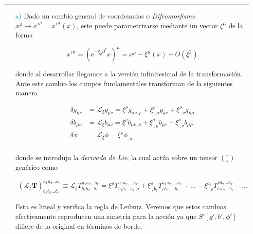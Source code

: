 \documentclass{article}
\numberwithin{equation}{section}
\begin{document}
\begin{center}
	\rule{0.5\textwidth}{0.4pt}
\end{center}

\begin{itemize}
	\item[\large{\textcolor{teal}{ a)}}] Dado un cambio general de coordenadas o \textit{Difeomorfismo} $ x^{\mu} \longrightarrow x'^{\mu}=x'^{\mu}(x) $, este puede parametrizarse mediante un vector $ \xi^{\mu} $ de la forma
	
	\begin{equation*}
	x'^{\mu}=\left(e^{-\xi_{\rho} \partial^{\rho}} x\right)^{\mu}= x^{\mu} - \xi^{\mu}(x) + O(\xi^2)
	\end{equation*} 
	
	donde al desarrollar llegamos a la versión infinitesimal de la transformación. Ante este cambio los campos fundamentales transforman de la siguientes manera
	
	\begin{subequations}
	\begin{align}
	\delta g_{\mu \nu} &= \mathcal{L}_{\xi}g_{\mu \nu} = \xi^{\rho}g_{\mu \nu , \rho} + \xi_{ \ ,\mu}^{\rho}g_{\rho \nu} + \xi_{ \ ,\nu}^{\rho}g_{\mu \rho}\\ \label{deltag}
	\delta b_{\mu \nu} &= \mathcal{L}_{\xi}b_{\mu \nu} = \xi^{\rho}b_{\mu \nu , \rho} + \xi_{ \ ,\mu}^{\rho}b_{\rho \nu} + \xi_{ \ ,\nu}^{\rho}b_{\mu \rho}\\ \label{deltab}
	\delta \phi &= \mathcal{L}_{\xi} \phi = \xi^{\rho} \phi_{,\rho} \\ \label{deltafi}
	\end{align}
	\end{subequations}
	
	donde se introdujo la \textit{derivada de Lie}, la cual actúa sobre un tensor $ \binom{r}{s} $ genérico como
	
\begin{equation*}
	\begin{aligned}
	\left(\mathcal{L}_{\xi}\textbf{T}\right)^{a_1a_2...a_r}_{b_1b_2...b_s} \equiv 
	\mathcal{L}_{\xi}T^{a_1a_2...a_r}_{b_1b_2...b_s} = \xi^{\rho}T^{a_1a_2,...a_r}_{b_1b_2...b_s,\rho}
	+ \xi^{\rho}_{ \ , b_1}T^{a_1a_2,...a_r}_{\rho b_2,...b_s} + \dots - \xi^{a_1}_{ \ , \rho}T^{\rho a_2...a_r}_{b_1 b_2...b_s} - \dots
	\end{aligned}
\end{equation*}
	
	Esta es lineal y verifica la regla de Leibniz. Veremos que estos cambios efectivamente reproducen una simetría para la acción ya que $S'[g',b',\phi']$ difiere de la original en términos de borde.\\
	

\end{itemize}
\end{document}
